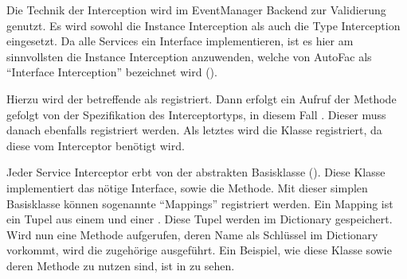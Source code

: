 

Die Technik der Interception wird im EventManager Backend zur Validierung genutzt. Es wird sowohl die Instance Interception als auch die Type Interception eingesetzt. Da alle Services ein Interface implementieren, ist es hier am sinnvollsten die Instance Interception anzuwenden, welche von AutoFac als \enquote{Interface Interception} bezeichnet wird ().


Hierzu wird der betreffende  als  registriert. Dann erfolgt ein Aufruf der Methode  gefolgt von der Spezifikation des Interceptortyps, in diesem Fall . Dieser muss danach ebenfalls registriert werden. Als letztes wird die  Klasse registriert, da diese vom Interceptor benötigt wird.

\newpage


Jeder Service Interceptor erbt von der abstrakten Basisklasse  (). Diese Klasse implementiert das nötige  Interface, sowie die  Methode. Mit dieser simplen Basisklasse können sogenannte \enquote{Mappings} registriert werden. Ein Mapping ist ein Tupel aus einem  und einer . Diese Tupel werden im  Dictionary gespeichert. Wird nun eine Methode aufgerufen, deren Name als Schlüssel im  Dictionary vorkommt, wird die zugehörige  ausgeführt. Ein Beispiel, wie diese Klasse sowie deren  Methode zu nutzen sind, ist in  zu sehen.


